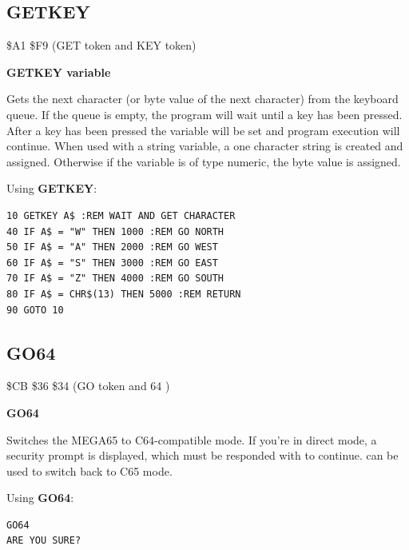 \subsection{GETKEY}
\begin{description}[leftmargin=2cm,style=nextline]
\item [Token:] \$A1 \$F9 (GET token and KEY token)
\item [Format:] {\bf GETKEY variable}
\item [Usage:] Gets the next character (or byte value of the next character)
               from the keyboard queue. If the queue is empty,
               the program will wait until a key has been pressed.
               After a key has been pressed the variable will be set
               and program execution will continue. When used with
               a string variable, a one character string is created and assigned.
               Otherwise if the variable is of type numeric, the byte value
               is assigned.

\item [Example:] Using {\bf GETKEY}:
\begin{tcolorbox}[colback=black,coltext=white]
\verbatimfont{\codefont}
\begin{verbatim}
10 GETKEY A$ :REM WAIT AND GET CHARACTER
40 IF A$ = "W" THEN 1000 :REM GO NORTH
50 IF A$ = "A" THEN 2000 :REM GO WEST
60 IF A$ = "S" THEN 3000 :REM GO EAST
70 IF A$ = "Z" THEN 4000 :REM GO SOUTH
80 IF A$ = CHR$(13) THEN 5000 :REM RETURN
90 GOTO 10
\end{verbatim}
\end{tcolorbox}
\end{description}


\newpage
\subsection{GO64}
\begin{description}[leftmargin=2cm,style=nextline]
\item [Token:] \$CB \$36 \$34 (GO token and 64 )
\item [Format:] {\bf GO64}
\item [Usage:] Switches the
               MEGA65 to C64-compatible mode. If you're in direct
               mode, a security prompt 
               is displayed, which must be responded with  to
               continue.  can be used to switch back
               to C65 mode.

\item [Example:] Using {\bf GO64}:
\begin{tcolorbox}[colback=black,coltext=white]
\verbatimfont{\codefont}
\begin{verbatim}
GO64
ARE YOU SURE?
\end{verbatim}
\end{tcolorbox}
\end{description}


